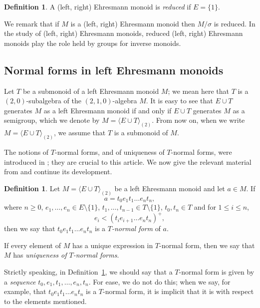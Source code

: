 \documentclass[12pt]{amsart}
\theoremstyle{definition}
\newtheorem{defn}[them]{Definition}
\theoremstyle{definition}
\numberwithin{them}{section}
\numberwithin{equation}{section}
\begin{document}
\begin{defn}\label{defn:reduced} A (left, right) Ehresmann monoid is {\em reduced} if $E=\{ 1\}$.
\end{defn}

We remark that if $M$ is a (left, right) Ehresmann monoid then $M/\sigma$ is reduced. In the study of (left, right)  Ehresmann monoids, reduced (left, right) Ehresmann monoids play the role held by groups for inverse monoids.


\subsection{Normal forms in left Ehresmann monoids}\label{sub:normalforms}

Let $T$ be a submonoid of a left Ehresmann monoid $M$; we mean here that $T$ is a $(2, 0)$-subalgebra of the $(2, 1, 0)$-algebra $M$. It is easy to see that $E \cup T$ generates $M$ as a left Ehresmann monoid if and only if $E \cup T$ generates $M$ as a semigroup, which we denote by $M = \langle E\cup T\rangle_{(2)}$. From now on, when we write $M = \langle E\cup T\rangle_{(2)}$,  we assume that $T$ is a submonoid of $M$.  



The notions of  $T$-normal forms, and of uniqueness of $T$-normal forms, were introduced in \cite{BGG}; they are crucial to this article.  We now give the relevant material from \cite{BGG} and continue its  development. 


\begin{defn}\label{defn:Tnormal} Let $M=\langle E \cup T \rangle_{(2)}$  be a left Ehresmann monoid and let $a\in M$. If
\[a= t_0e_1t_1\dots e_nt_n,\]
where $n \geq 0$, $e_1, \dots, e_n \in E\setminus \{1\}$, $t_1, \dots, t_{n-1} \in T\setminus \{1\}$, $t_0, t_n \in T$ and for $1 \leq i \leq n$,
\[e_i < (t_ie_{i+1}\dots e_nt_n)^{+}, \]
then we say that $t_0e_1t_1\dots e_nt_n$ is a {\em $T$-normal form } of $a$. 



 If every element of $M$ has a unique expression in $T$-normal form, then we say that $M$ has {\em uniqueness of $T$-normal forms}. 
\end{defn}


 Strictly speaking, in Definition~\ref{defn:Tnormal}, we should say that a $T$-normal form is given by a {\em sequence} $t_0,e_1,t_1,\dots, e_n,t_n$.  For ease, we do not do this; when we say, for example, that $t_0e_1t_1\dots e_nt_n$ is a $T$-normal form, it is implicit that it is with respect to the elements mentioned.
\end{document}
